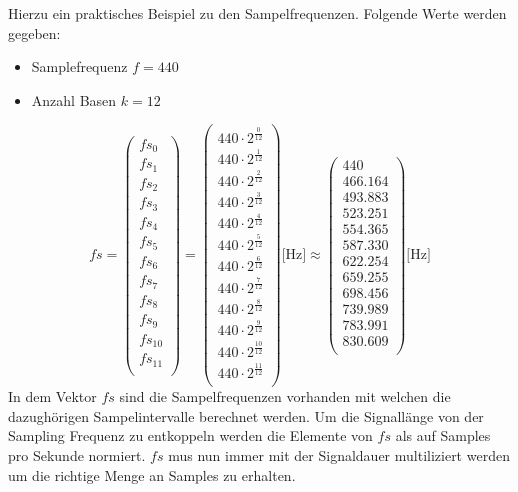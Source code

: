 Hierzu ein praktisches Beispiel zu den Sampelfrequenzen. Folgende Werte werden gegeben:
\begin{itemize}
	\item Samplefrequenz $f=440$\text{[Hz]}
	\item Anzahl Basen $k=12$
\end{itemize}	

\[
fs
=
 \begin{pmatrix}
fs_{0}\\
fs_{1}\\
fs_{2}\\
fs_{3}\\
fs_{4}\\
fs_{5}\\
fs_{6}\\
fs_{7}\\
fs_{8}\\
fs_{9}\\
fs_{10}\\
fs_{11}\\
\end{pmatrix}
=
\begin{pmatrix}
440\cdot2^{\frac{0}{12}}\\
440\cdot2^{\frac{1}{12}}\\
440\cdot2^{\frac{2}{12}}\\
440\cdot2^{\frac{3}{12}}\\
440\cdot2^{\frac{4}{12}}\\
440\cdot2^{\frac{5}{12}}\\
440\cdot2^{\frac{6}{12}}\\
440\cdot2^{\frac{7}{12}}\\
440\cdot2^{\frac{8}{12}}\\
440\cdot2^{\frac{9}{12}}\\
440\cdot2^{\frac{10}{12}}\\
440\cdot2^{\frac{11}{12}}\\
\end{pmatrix}
 \text{[Hz]}
 \approx
 \begin{pmatrix}
 440\\
466.164\\
493.883\\
523.251\\
554.365\\
587.330\\
622.254\\
659.255\\
698.456\\
739.989\\
783.991\\
830.609\\
 \end{pmatrix}
 \text{[Hz]} 
\]
In dem Vektor $fs$ sind die Sampelfrequenzen vorhanden mit welchen die dazughörigen Sampelintervalle berechnet werden. Um die  Signallänge von der Sampling Frequenz zu entkoppeln werden die Elemente von $fs$ als auf Samples pro Sekunde normiert. $fs$ mus nun immer mit der Signaldauer multiliziert werden um die richtige Menge an Samples zu erhalten.\\

